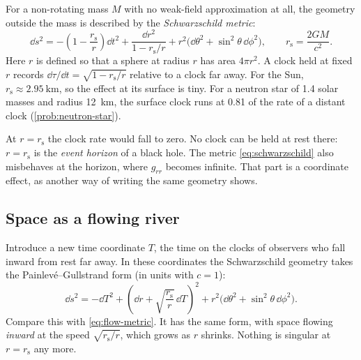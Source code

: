 For a non-rotating mass $M$ with no weak-field approximation at all, the
geometry outside the mass is described by the \emph{Schwarzschild metric}:
\begin{equation}
  \dd s^{2} = -\left(1 - \frac{r_{\mathrm{s}}}{r}\right)\dd t^{2}
  + \frac{\dd r^{2}}{1 - r_{\mathrm{s}}/r}
  + r^{2}\bigl(\dd\theta^{2} + \sin^{2}\theta\,\dd\phi^{2}\bigr),
  \qquad r_{\mathrm{s}} = \frac{2GM}{c^{2}} .
  \label{eq:schwarzschild}
\end{equation}
Here $r$ is defined so that a sphere at radius $r$ has area $4\pi r^{2}$. A
clock held at fixed $r$ records $\dd\tau/\dd t = \sqrt{1 - r_{\mathrm{s}}/r}$
relative to a clock far away. For the Sun, $r_{\mathrm{s}} \approx
\SI{2.95}{\kilo\metre}$, so the effect at its surface is tiny. For a neutron star
of 1.4 solar masses and radius \SI{12}{\kilo\metre}, the surface clock runs at
0.81 of the rate of a distant clock (\cref{prob:neutron-star}).

At $r = r_{\mathrm{s}}$ the clock rate would fall to zero. No clock can be held
at rest there: $r = r_{\mathrm{s}}$ is the \emph{event horizon} of a black hole.
The metric \cref{eq:schwarzschild} also misbehaves at the horizon, where
$g_{rr}$ becomes infinite. That part is a coordinate effect, as another way of
writing the same geometry shows.

\subsection{Space as a flowing river}

Introduce a new time coordinate $T$, the time on the clocks of observers who
fall inward from rest far away. In these coordinates the Schwarzschild geometry
takes the Painlevé--Gullstrand form (in units with $c = 1$):
\begin{equation}
  \dd s^{2} = -\dd T^{2} + \left(\dd r + \sqrt{\frac{r_{\mathrm{s}}}{r}}\,\dd T\right)^{2}
  + r^{2}\bigl(\dd\theta^{2} + \sin^{2}\theta\,\dd\phi^{2}\bigr).
  \label{eq:river}
\end{equation}
Compare this with \cref{eq:flow-metric}. It has the same form, with space
flowing \emph{inward} at the speed $\sqrt{r_{\mathrm{s}}/r}$, which grows as
$r$ shrinks. Nothing is singular at $r = r_{\mathrm{s}}$ any more.


